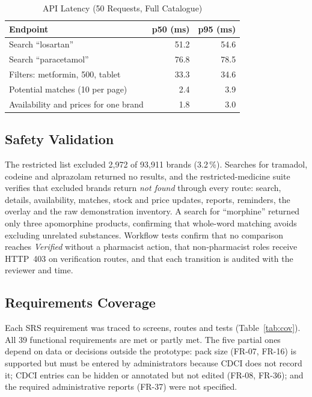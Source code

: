 \documentclass[conference]{IEEEtran}
\begin{document}
\begin{table}[!t]
\caption{API Latency (50 Requests, Full Catalogue)}
\label{tab:perf}
\centering
\scriptsize
\begin{tabular}{@{}lrr@{}}
\toprule
Endpoint & p50 (ms) & p95 (ms) \\
\midrule
Search ``losartan''                         & 51.2 & 54.6 \\
Search ``paracetamol''                      & 76.8 & 78.5 \\
Filters: metformin, 500, tablet             & 33.3 & 34.6 \\
Potential matches (10 per page)             & 2.4  & 3.9 \\
Availability and prices for one brand       & 1.8  & 3.0 \\
\bottomrule
\end{tabular}
\end{table}

\subsection{Safety Validation}
The restricted list excluded 2{,}972 of 93{,}911 brands (3.2\,\%). Searches for tramadol, codeine and alprazolam returned no results, and the restricted-medicine suite verifies that excluded brands return \emph{not found} through every route: search, details, availability, matches, stock and price updates, reports, reminders, the overlay and the raw demonstration inventory. A search for ``morphine'' returned only three apomorphine products, confirming that whole-word matching avoids excluding unrelated substances. Workflow tests confirm that no comparison reaches \emph{Verified} without a pharmacist action, that non-pharmacist roles receive HTTP~403 on verification routes, and that each transition is audited with the reviewer and time.

\subsection{Requirements Coverage}
Each SRS requirement was traced to screens, routes and tests (Table~\ref{tab:cov}). All 39 functional requirements are met or partly met. The five partial ones depend on data or decisions outside the prototype: pack size (FR-07, FR-16) is supported but must be entered by administrators because CDCI does not record it; CDCI entries can be hidden or annotated but not edited (FR-08, FR-36); and the required administrative reports (FR-37) were not specified.
\end{document}
